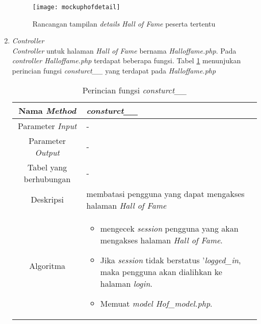\begin{enumerate}
	\begin{figure}[H]
		\centering  
		\texttt{[image: mockuphofdetail]}  
		\caption[Rancangan tampilan \textit{details} \textit{Hall of Fame} peserta tertentu]{Rancangan tampilan \textit{details} \textit{Hall of Fame} peserta tertentu} 
		\label{fig:mockuphofdetail} 
	\end{figure}
	
	\item \textit{Controller} \\
	\textit{Controller} untuk halaman \textit{Hall of Fame} bernama \textit{Halloffame.php}. Pada \textit{controller Halloffame.php} terdapat beberapa fungsi. Tabel \ref{tab:f3hof} menunjukan perincian fungsi \textit{consturct\_\_} yang terdapat pada \textit{Halloffame.php}
	\begin{table}[H]
		\caption{Perincian fungsi \textit{consturct\_\_}}
		\label{tab:f3hof}
		\begin{tabular}{|c|p{11cm}|}
			\hline
			Nama \textit{Method} 	& 	\textit{consturct\_\_} 	\\
			\hline
			Parameter \textit{Input} & - \\
			\hline
			Parameter \textit{Output} &  - \\
			\hline
			Tabel yang berhubungan & - \\
			\hline
			Deskripsi	& membatasi pengguna yang dapat mengakses halaman \textit{Hall of Fame}	 \\
			\hline
			Algoritma	& \begin{itemize}
				\item mengecek \textit{session} pengguna yang akan mengakses halaman \textit{Hall of Fame}.
				\item Jika \textit{session} tidak berstatus '\textit{logged\_in}, maka pengguna akan dialihkan ke halaman \textit{login}.
				\item Memuat \textit{model Hof\_model.php}.
			\end{itemize} \\
			\hline
		\end{tabular}
	\end{table}
	

\end{enumerate}
